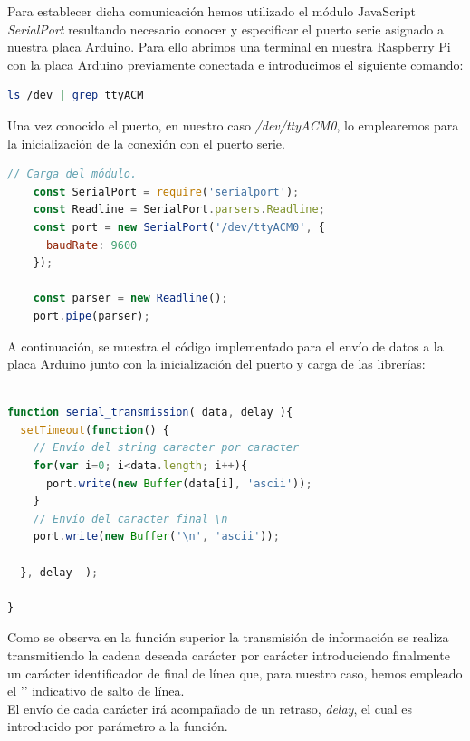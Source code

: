 Para establecer dicha comunicación hemos utilizado el módulo JavaScript \emph{SerialPort} resultando necesario conocer y especificar el puerto serie asignado a nuestra placa Arduino. 
Para ello abrimos una terminal en nuestra Raspberry Pi con la placa Arduino previamente conectada e introducimos el siguiente comando:\\

\begin{lstlisting}[language=bash]
ls /dev | grep ttyACM
\end{lstlisting}

Una vez conocido el puerto, en nuestro caso \emph{/dev/ttyACM0}, lo emplearemos para la inicialización de la conexión con el puerto serie.\\

\begin{lstlisting}[language=JavaScript]
    // Carga del módulo.
    const SerialPort = require('serialport');
    const Readline = SerialPort.parsers.Readline;
    const port = new SerialPort('/dev/ttyACM0', {
      baudRate: 9600
    });
    
    const parser = new Readline();
    port.pipe(parser);
\end{lstlisting}


A continuación, se muestra el código implementado para el envío de datos a la placa Arduino  junto con la inicialización del puerto y carga de las librerías:\\

\begin{lstlisting}[language=JavaScript]

function serial_transmission( data, delay ){
  setTimeout(function() {
    // Envío del string caracter por caracter
    for(var i=0; i<data.length; i++){
      port.write(new Buffer(data[i], 'ascii'));
    }
    // Envío del caracter final \n
    port.write(new Buffer('\n', 'ascii'));

  }, delay  );

}
\end{lstlisting}

Como se observa en la función superior la transmisión de información se realiza transmitiendo la cadena deseada carácter por carácter introduciendo finalmente un carácter identificador de final de línea que,
para nuestro caso, hemos empleado el '\n' indicativo de salto de línea.\\

El envío de cada carácter irá acompañado de un retraso, \emph{delay}, el cual es introducido por parámetro a la función.\\

